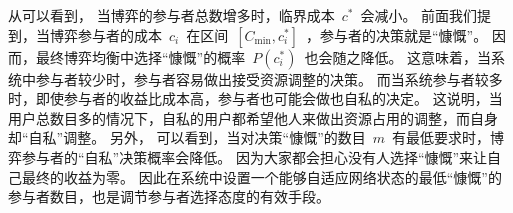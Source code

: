 从可以看到，
当博弈的参与者总数增多时，临界成本~$c^*$~会减小。
前面我们提到，当博弈参与者的成本~$c_i$~在区间~$ [C_{\min}, c_i^*] $~，参与者的决策就是“慷慨”。
因而，最终博弈均衡中选择“慷慨”的概率~$P(c_i^*)$~也会随之降低。
这意味着，当系统中参与者较少时，参与者容易做出接受资源调整的决策。
而当系统参与者较多时，即使参与者的收益比成本高，参与者也可能会做也自私的决定。
这说明，当用户总数目多的情况下，自私的用户都希望他人来做出资源占用的调整，而自身却“自私”调整。
另外，
可以看到，当对决策“慷慨”的数目~$m$~有最低要求时，博弈参与者的“自私”决策概率会降低。
因为大家都会担心没有人选择“慷慨”来让自己最终的收益为零。
因此在系统中设置一个能够自适应网络状态的最低“慷慨”的参与者数目，也是调节参与者选择态度的有效手段。

